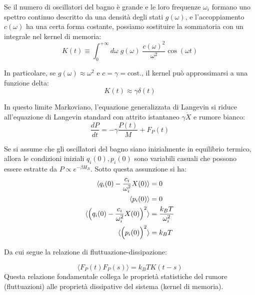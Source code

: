 Se il numero di oscillatori del bagno è grande e le loro frequenze $\omega_i$ formano uno spettro continuo descritto da una densità degli stati $g(\omega)$, e l'accoppiamento $c(\omega)$ ha una certa forma costante, possiamo sostituire la sommatoria con un integrale nel kernel di memoria:
\begin{equation}
K(t) \equiv \int_0^{+ \infty} d\omega \; g(\omega) \; \frac{c(\omega)^2}{\omega^2} \cos(\omega t)
\end{equation}

In particolare, se $g(\omega) \approx \omega^2$ e $c=\gamma=\text{cost.}$, il kernel può approssimarsi a una funzione delta:
\begin{equation}
K(t) \approx  \gamma\delta(t)  
\end{equation}

In questo limite Markoviano, l'equazione generalizzata di Langevin si riduce all'equazione di Langevin standard con attrito istantaneo $\gamma \dot{X}$ e rumore bianco:
\begin{equation}
\frac{dP}{dt} = -\gamma \frac{P(t)}{M} + F_P(t)
\end{equation}

Se si assume che gli oscillatori del bagno siano inizialmente in equilibrio termico, allora le condizioni iniziali $q_i(0), p_i(0)$ sono variabili casuali che possono essere estratte da $P \propto e^{-\beta H_B}$. Sotto questa assunzione si ha:
\begin{align*}
\langle q_i(0) - \frac{c_i}{\omega_i^2}X(0) \rangle &= 0 \\
\langle p_i(0)\rangle &= 0 \\
\langle \Bigl( q_i(0) - \frac{c_i}{\omega_i^2}X(0) \Bigr)^2 \rangle &= \frac{k_B T}{\omega_i^2} \\
\langle \Bigl(p_i(0) \Bigr)^2 \rangle &= k_B T
\end{align*}

Da cui segue la relazione di fluttuazione-dissipazione:
\begin{tcolorbox}[
    colback=colorA!5,      
    colframe=colorA,       
    arc=3mm,               
    boxrule=1.2pt
]
\begin{equation}
\langle F_P(t) F_P(s) \rangle = k_B T K(t-s)
\end{equation}
Questa relazione fondamentale collega le proprietà statistiche del rumore (fluttuazioni) alle proprietà dissipative del sistema (kernel di memoria).
\end{tcolorbox}